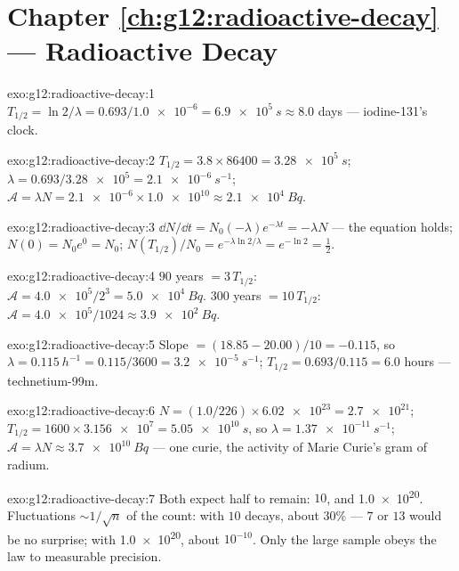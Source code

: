 \section*{Chapter \ref{ch:g12:radioactive-decay} --- Radioactive Decay}

\begin{solution}{exo:g12:radioactive-decay:1}
$T_{1/2} = \ln 2/\lambda = 0.693/\num{1.0e-6} = \qty{6.9e5}{s}
\approx 8.0$ days --- iodine-131's clock.
\end{solution}

\begin{solution}{exo:g12:radioactive-decay:2}
$T_{1/2} = 3.8 \times \num{86400} = \qty{3.28e5}{s}$;
$\lambda = 0.693/\num{3.28e5} = \qty{2.1e-6}{s^{-1}}$;
$\mathcal A = \lambda N = \num{2.1e-6} \times \num{1.0e10} \approx
\qty{2.1e4}{Bq}$.
\end{solution}

\begin{solution}{exo:g12:radioactive-decay:3}
$\dd N/\dd t = N_0(-\lambda)e^{-\lambda t} = -\lambda N$ ---
the equation holds; $N(0) = N_0 e^0 = N_0$;
$N(T_{1/2})/N_0 = e^{-\lambda \ln 2/\lambda} = e^{-\ln 2} =
\tfrac12$.
\end{solution}

\begin{solution}{exo:g12:radioactive-decay:4}
$90$ years $= 3\,T_{1/2}$: $\mathcal A = \num{4.0e5}/2^3 =
\qty{5.0e4}{Bq}$. $300$ years $= 10\,T_{1/2}$:
$\mathcal A = \num{4.0e5}/1024 \approx \qty{3.9e2}{Bq}$.
\end{solution}

\begin{solution}{exo:g12:radioactive-decay:5}
Slope $= (18.85 - 20.00)/10 = -0.115$, so
$\lambda = \qty{0.115}{h^{-1}} = 0.115/3600 = \qty{3.2e-5}{s^{-1}}$;
$T_{1/2} = 0.693/0.115 = 6.0$ hours --- technetium-99m.
\end{solution}

\begin{solution}{exo:g12:radioactive-decay:6}
$N = (1.0/226) \times \num{6.02e23} = \num{2.7e21}$;
$T_{1/2} = 1600 \times \num{3.156e7} = \qty{5.05e10}{s}$, so
$\lambda = \qty{1.37e-11}{s^{-1}}$;
$\mathcal A = \lambda N \approx \qty{3.7e10}{Bq}$ --- one curie, the
activity of Marie Curie's gram of radium.
\end{solution}

\begin{solution}{exo:g12:radioactive-decay:7}
Both expect half to remain: $10$, and \num{1.0e20}. Fluctuations
$\sim 1/\sqrt{n}$ of the count: with $10$ decays, about $30\%$ ---
$7$ or $13$ would be no surprise; with \num{1.0e20}, about
$10^{-10}$. Only the large sample obeys the law to measurable
precision.
\end{solution}

